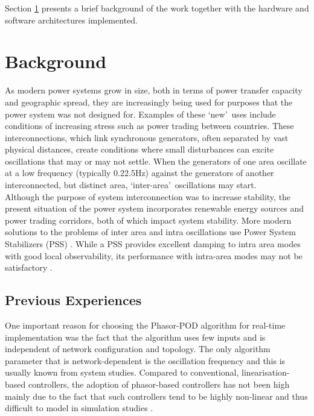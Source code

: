 \documentclass[journal]{IEEEtran}
\begin{document}
Section \ref{Background} presents a brief background of the work together with the hardware and software architectures implemented.



 

\section{Background}\label{Background}
As modern power systems grow in size, both in terms of power transfer capacity and geographic spread, they are increasingly being used for purposes that the power system was not designed for. Examples of these \textquoteleft new\textquoteright ~uses include conditions of increasing stress such as power trading between countries. These interconnections, which link synchronous generators, often separated by vast physical distances, create conditions where small disturbances can excite oscillations that may or may not settle. When the generators of one area oscillate at a low frequency (typically 0.2\textendash 2.5Hz) against the generators of another interconnected, but distinct area, \textquoteleft inter-area\textquoteright ~oscillations may start.\\

Although the purpose of system interconnection was to increase stability, the present situation of the power system incorporates renewable energy sources and power trading corridors, both of which impact system stability. More modern solutions to the problems of inter area and intra oscillations use Power System Stabilizers (PSS) \cite{Dmello}. While a PSS provides excellent damping to intra area modes with good local observability, its performance with intra-area modes may not be satisfactory \cite{localREMcomparison}.\\


\subsection{Previous Experiences}

One important reason for choosing the Phasor-POD algorithm for real-time implementation was the fact that the algorithm uses few inputs and is independent of network configuration and topology. The only algorithm parameter that is network-dependent is the oscillation frequency and this is usually known from system studies. Compared to conventional, linearisation-based controllers, the adoption of phasor-based controllers has not been high mainly due to the fact that such controllers tend to be highly non-linear and thus difficult to model in simulation studies \cite{Chaudhuri}.
\end{document}
